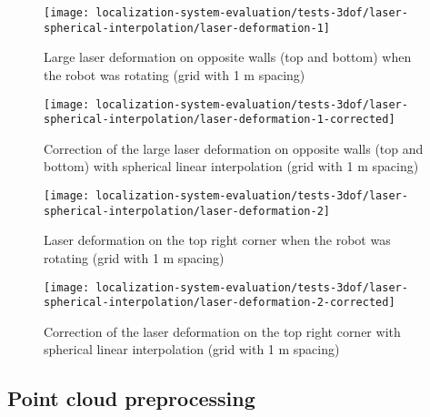 \begin{figure}[H]
	\centering
	\texttt{[image: localization-system-evaluation/tests-3dof/laser-spherical-interpolation/laser-deformation-1]}
	\caption{Large laser deformation on opposite walls (top and bottom) when the robot was rotating (grid with 1 m spacing)}
	\label{fig:localization-system-evaluation_laser-deformation-1}
\end{figure}

\begin{figure}[H]
	\centering
	\texttt{[image: localization-system-evaluation/tests-3dof/laser-spherical-interpolation/laser-deformation-1-corrected]}
	\caption{Correction of the large laser deformation on opposite walls (top and bottom) with spherical linear interpolation (grid with 1 m spacing)}
	\label{fig:localization-system-evaluation_laser-deformation-1-corrected}
\end{figure}


\begin{figure}[H]
	\centering
	\texttt{[image: localization-system-evaluation/tests-3dof/laser-spherical-interpolation/laser-deformation-2]}
	\caption{Laser deformation on the top right corner when the robot was rotating (grid with 1 m spacing)}
	\label{fig:localization-system-evaluation_laser-deformation-2}
\end{figure}

\begin{figure}[H]
	\centering
	\texttt{[image: localization-system-evaluation/tests-3dof/laser-spherical-interpolation/laser-deformation-2-corrected]}
	\caption{Correction of the laser deformation on the top right corner with spherical linear interpolation (grid with 1 m spacing)}
	\label{fig:localization-system-evaluation_laser-deformation-2-corrected}
\end{figure}



\subsection{Point cloud preprocessing}

